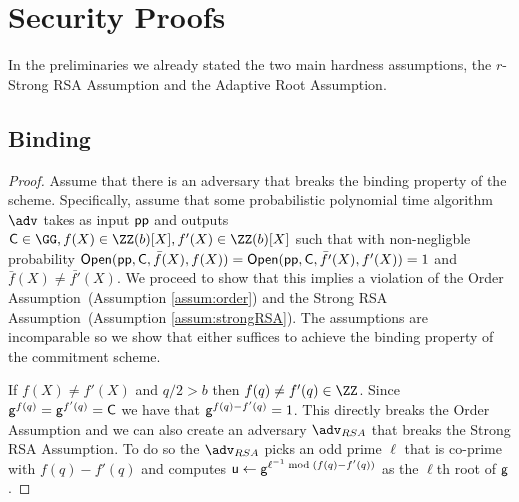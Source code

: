 \clearpage
\section*{\scalebox{1.25}{\appendixphrase}}

\ifappendix
\section{Security Proofs}
\label{appendix:hardness}
In the preliminaries we already stated the two main hardness assumptions, the $r$-Strong RSA Assumption and the Adaptive Root Assumption.

\fi

\subsection{Binding}
\label{appendix:binding}
\def\thelemma{\ref{lem:binding}}
\begin{lemma}
	\bindinglemma
\end{lemma}
\begin{proof}
    Assume that there is an adversary that breaks the binding property of the scheme. Specifically, assume that some probabilistic polynomial time algorithm $\adv$ takes as input $\textsf{pp}$ and outputs $\gr{C} \in \GG, f(X) \in \ZZ(b)[X], f'(X)\in \ZZ(b)[X]$ such that with non-negligble probability $\textsf{{Open}}(\textsf{pp}, \mathsf{C}, \bar{f}(X), f(X)) = \textsf{{Open}}(\textsf{pp}, \mathsf{C}, \bar{f'}(X), f'(X)) = 1$ and $\bar{f}(X) \neq \bar{f'}(X)$. We proceed to show that this implies a violation of the Order Assumption~(Assumption \ref{assum:order}) and the Strong RSA Assumption~(Assumption \ref{assum:strongRSA}). The assumptions are incomparable so we show that either suffices to achieve the binding property of the commitment scheme.
    
	If $f(X)\neq f'(X)$ and $q/2>b$ then $f(q)\neq f'(q)\in \ZZ$. Since $\mathsf{g}^{f(q)}=\mathsf{g}^{f'(q)}=\mathsf{C}$ we have that $\mathsf{g}^{f(q)-f'(q)}=1$. This directly breaks the Order Assumption and we can also create an adversary $\adv_{RSA}$ that breaks the Strong RSA Assumption. To do so the $\adv_{RSA}$ picks an odd prime $\ell$ that is co-prime with $f(q)-f'(q)$ and computes $\mathsf{u}\gets \mathsf{g}^{\ell^{-1} \bmod (f(q)-f'(q))}$ as the $\ell$th root of $\mathsf{g}$.
\end{proof}

